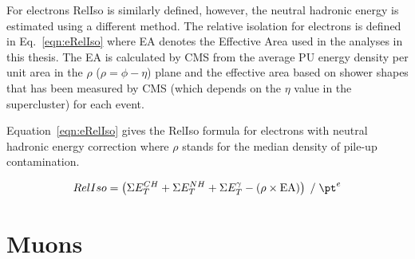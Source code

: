 For electrons RelIso is similarly defined, however, the neutral hadronic energy is estimated using a different method. The relative isolation for electrons is defined in Eq.~\ref{eqn:eRelIso} where EA denotes the Effective Area used in the analyses in this thesis. The EA is calculated by CMS from the average PU energy density per unit area in the $\rho$ ($\rho=\phi-\eta$) plane and the effective area based on shower shapes that has been measured by CMS (which depends on the $\eta$ value in the supercluster) for each event.


Equation~\ref{eqn:eRelIso} gives the RelIso formula for electrons with neutral hadronic energy correction where $\rho$ stands for the median density of pile-up contamination.

\begin{centering}
\begin{equation}
RelIso = \left( \Sigma E_{T}^{CH} + \Sigma E_{T}^{NH} + \Sigma E_{T}^{\gamma} - (\rho\times\textrm{EA}) \right) \; / \;   \pt^{e}
\label{eqn:eRelIso}
\end{equation}
\end{centering}


\section{Muons \label{sec:muonreco}}

